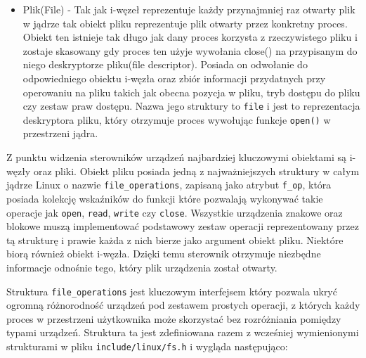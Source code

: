 \documentclass[10pt]{article}
\begin{document}
\begin{itemize}
\item
  Plik(File) - Tak jak i-węzeł reprezentuje każdy przynajmniej raz otwarty plik w jądrze tak obiekt pliku reprezentuje plik otwarty przez konkretny proces. Obiekt ten istnieje tak długo jak dany proces korzysta z rzeczywistego pliku i zostaje skasowany gdy proces ten użyje wywołania close() na przypisanym do niego deskryptorze pliku(file descriptor). Posiada on odwołanie do odpowiedniego obiektu i-węzła oraz zbiór informacji przydatnych przy operowaniu na pliku takich jak obecna pozycja w pliku, tryb dostępu do pliku czy zestaw praw dostępu. Nazwa jego struktury to \texttt{file} i jest to reprezentacja deskryptora pliku, który otrzymuje proces wywołując funkcje \texttt{open()} w przestrzeni jądra.
\end{itemize}

Z punktu widzenia sterowników urządzeń najbardziej kluczowymi obiektami są i-węzły oraz pliki. Obiekt pliku posiada jedną z najważniejszych struktury w całym jądrze Linux o nazwie \texttt{file\_operations}, zapisaną jako atrybut \texttt{f\_op}, która posiada kolekcję wskaźników do funkcji które pozwalają wykonywać takie operacje jak \texttt{open}, \texttt{read}, \texttt{write} czy \texttt{close}. Wszystkie urządzenia znakowe oraz blokowe muszą implementować podstawowy zestaw operacji reprezentowany przez tą strukturę i prawie każda z nich bierze jako argument obiekt pliku. Niektóre biorą również obiekt i-węzła. Dzięki temu sterownik otrzymuje niezbędne informacje odnośnie tego, który plik urządzenia został otwarty.

Struktura \texttt{file\_operations} jest kluczowym interfejsem który pozwala ukryć ogromną różnorodność urządzeń pod zestawem prostych operacji, z których każdy proces w przestrzeni użytkownika może skorzystać bez rozróżniania pomiędzy typami urządzeń. Struktura ta jest zdefiniowana razem z wcześniej wymienionymi strukturami w pliku \texttt{include/linux/fs.h} i wygląda następująco:
\end{document}

